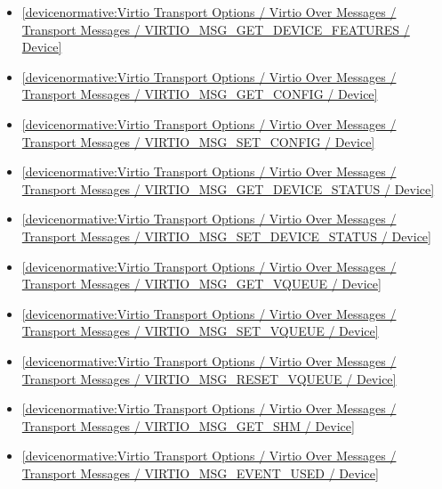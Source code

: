 \begin{itemize}
\item \ref{devicenormative:Virtio Transport Options / Virtio Over Messages / Transport Messages / VIRTIO_MSG_GET_DEVICE_FEATURES / Device}
\item \ref{devicenormative:Virtio Transport Options / Virtio Over Messages / Transport Messages / VIRTIO_MSG_GET_CONFIG / Device}
\item \ref{devicenormative:Virtio Transport Options / Virtio Over Messages / Transport Messages / VIRTIO_MSG_SET_CONFIG / Device}
\item \ref{devicenormative:Virtio Transport Options / Virtio Over Messages / Transport Messages / VIRTIO_MSG_GET_DEVICE_STATUS / Device}
\item \ref{devicenormative:Virtio Transport Options / Virtio Over Messages / Transport Messages / VIRTIO_MSG_SET_DEVICE_STATUS / Device}
\item \ref{devicenormative:Virtio Transport Options / Virtio Over Messages / Transport Messages / VIRTIO_MSG_GET_VQUEUE / Device}
\item \ref{devicenormative:Virtio Transport Options / Virtio Over Messages / Transport Messages / VIRTIO_MSG_SET_VQUEUE / Device}
\item \ref{devicenormative:Virtio Transport Options / Virtio Over Messages / Transport Messages / VIRTIO_MSG_RESET_VQUEUE / Device}
\item \ref{devicenormative:Virtio Transport Options / Virtio Over Messages / Transport Messages / VIRTIO_MSG_GET_SHM / Device}
\item \ref{devicenormative:Virtio Transport Options / Virtio Over Messages / Transport Messages / VIRTIO_MSG_EVENT_USED / Device}
\end{itemize}

























